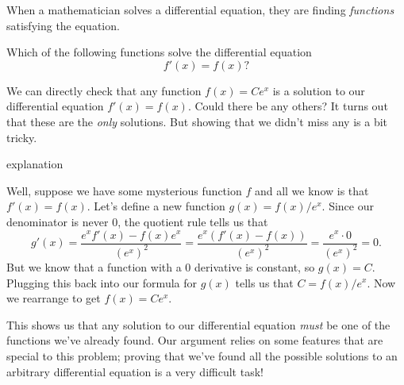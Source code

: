 \documentclass{ximera}
\begin{document}
When a mathematician solves a differential equation, they are finding
\textit{functions} satisfying the equation.
\begin{question}
  Which of the following functions solve the differential equation
  \[
  f'(x) = f(x)?
  \]
  \begin{selectAll}
  \end{selectAll}
\end{question}
\begin{remark}
    We can directly check that any function $f(x)=Ce^x$ is a solution to our differential equation $f'(x)=f(x)$. Could there be any others? It turns out that these are the \textit{only} solutions. But showing that we didn't miss any is a bit tricky.
    \begin{expandable}{explanation}{}
   \begin{explanation}
    Well, suppose we have some mysterious function $f$ and all we know is that $f'(x)=f(x)$. Let's define a new function $g(x)=f(x)/e^x$. Since our denominator is never 0, the quotient rule tells us that
    \[
	    g'(x)= \frac{e^x f'(x)- f(x) e^x}{(e^x)^2} = \frac{e^x\left(f'(x)- f(x)\right)}{(e^x)^2} = \frac{e^x\cdot 0}{(e^x)^2}=0.
    \]
    But we know that a function with a 0 derivative is constant, so $g(x)=C$. Plugging this back into our formula for $g(x)$ tells us that $C=f(x)/e^x$. Now we rearrange to get $f(x)=Ce^x$.
    
    This shows us that any solution to our differential equation \textit{must} be one of the functions we've already found. Our argument relies on some features that are special to this problem; proving that we've found all the possible solutions to an arbitrary differential equation is a very difficult task!   
   \end{explanation} 
    \end{expandable}
\end{remark}
	
\end{document}
